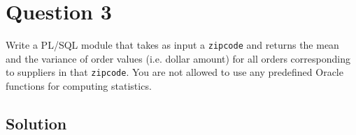 
\section*{Question 3}

Write a PL/SQL module that takes as input a \texttt{zipcode} and returns the mean and the variance of order values (i.e. dollar amount) for all orders corresponding to suppliers in that \texttt{zipcode}.
You are not allowed to use any predefined Oracle functions for computing statistics.

\subsection*{Solution}

\lstset{language=SQL}

